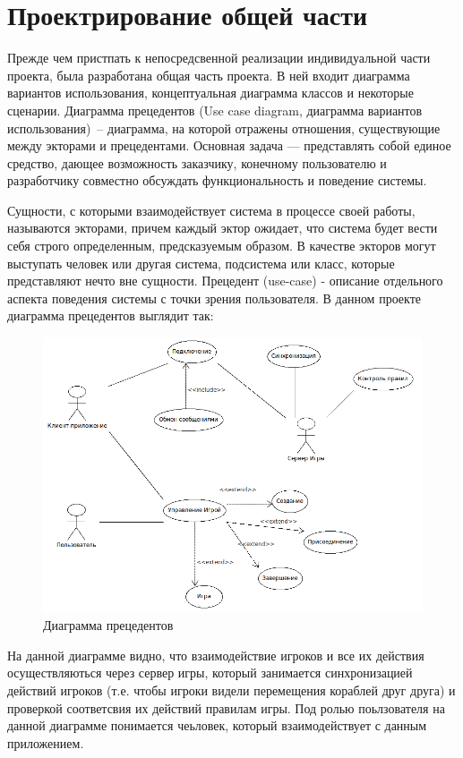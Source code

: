 ﻿\section{Проектрирование общей части}
Прежде чем пристпать к непосредсвенной реализации индивидуальной части проекта, была разработана
общая часть проекта. В ней входит диаграмма вариантов использования, концептуальная диаграмма классов и некоторые сценарии.
Диаграмма прецедентов (Use case diagram, диаграмма вариантов использования)~-- диаграмма, на которой отражены отношения, 
существующие между экторами и прецедентами.
Основная задача — представлять собой единое средство, дающее возможность заказчику, конечному пользователю и разработчику совместно
обсуждать функциональность и поведение системы.

Сущности, с которыми взаимодействует система в процессе своей работы, называются экторами, причем каждый эктор ожидает, 
что система будет вести себя строго определенным, предсказуемым образом. В качестве экторов могут выступать человек или 
другая система, подсистема или класс, которые представляют нечто вне сущности.
Прецедент (use-case) - описание отдельного аспекта поведения системы с точки зрения пользователя.
В данном проекте диаграмма прецедентов выглядит так:

\begin{figure}[h]
\centering
\includegraphics[width=18cm]{images/use.png}
\caption{Диаграмма прецедентов}
\label{fig.0}
\end{figure}

На данной диаграмме видно, что взаимодействие игроков и все их действия осуществляються через сервер игры, который
занимается синхронизацией действий игроков (т.е. чтобы игроки видели перемещения кораблей друг друга)
и проверкой соответсвия их действий правилам игры. Под ролью поьлзователя на данной диаграмме понимается 
чеьловек, который взаимодействует с данным приложением.

\endinput

